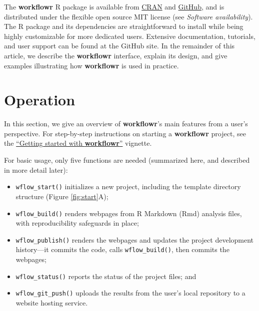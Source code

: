 \documentclass[9pt,a4paper]{extarticle}
\begin{document}
The \textbf{workflowr} R package is available from
\href{https://cran.r-project.org/package=workflowr}{CRAN} and
\href{https://github.com/jdblischak/workflowr}{GitHub}, and is
distributed under the flexible open source MIT license (see
\textit{Software availability}). The R package and its dependencies are
straightforward to install while being highly customizable for more
dedicated users. Extensive documentation, tutorials, and user support
can be found at the GitHub site. In the remainder of this article, we
describe the \textbf{workflowr} interface, explain its design, and give examples
illustrating how \textbf{workflowr} is used in practice.


\section*{Operation}

In this section, we give an overview of \textbf{workflowr}'s main features from a
user's perspective. For step-by-step instructions on starting a
 \textbf{workflowr} project, see the
\href{https://jdblischak.github.io/workflowr/articles/wflow-01-getting-started.html}{``Getting
started with \textbf{workflowr}''} vignette.

For basic usage, only five functions are needed (summarized here, and
described in more detail later):

\begin{itemize}

\item \texttt{wflow\_start()} initializes a new project, including the template
directory structure (Figure \ref{fig:start}A);

\item \texttt{wflow\_build()} renders webpages from R Markdown (Rmd) analysis
files, with reproducibility safeguards in place;

\item \texttt{wflow\_publish()} renders the webpages and updates the project
development history—it commits the code, calls \texttt{wflow\_build()}, then
commits the webpages;

\item \texttt{wflow\_status()} reports the status of the project files; and

\item \texttt{wflow\_git\_push()} uploads the results from the user's local
repository to a website hosting service.

\end{itemize}
\end{document}
